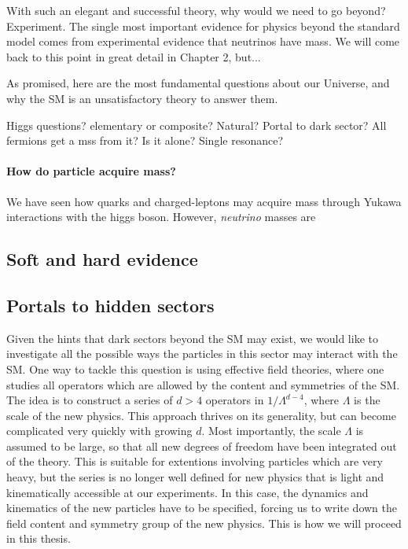 With such an elegant and successful theory, why would we need to go beyond? Experiment. The single most important evidence for physics beyond the standard model comes from experimental evidence that neutrinos have mass. We will come back to this point in great detail in Chapter 2, but...

As promised, here are the most fundamental questions about our Universe, and why the SM is an unsatisfactory theory to answer them.


Higgs questions? elementary or composite? Natural? Portal to dark sector? All fermions get a mss from it? Is it alone? Single resonance?


\paragraph{How do particle acquire mass?} We have seen how quarks and charged-leptons may acquire mass through Yukawa interactions with the higgs boson. However, \emph{neutrino} masses are 


\subsection{Soft and hard evidence}

\subsection{Portals to hidden sectors}

Given the hints that dark sectors beyond the SM may exist, we would like to investigate all the possible ways the particles in this sector may interact with the SM. One way to tackle this question is using effective field theories, where one studies all operators which are allowed by the content and symmetries of the SM. The idea is to construct a series of $d>4$ operators in $1/\Lambda^{d-4}$, where $\Lambda$ is the scale of the new physics. This approach thrives on its generality, but can become complicated very quickly with growing $d$. Most importantly, the scale $\Lambda$ is assumed to be large, so that all new degrees of freedom have been integrated out of the theory. This is suitable for extentions involving particles which are very heavy, but the series is no longer well defined for new physics that is light and kinematically accessible at our experiments. In this case, the dynamics and kinematics of the new particles have to be specified, forcing us to write down the field content and symmetry group of the new physics. This is how we will proceed in this thesis.

